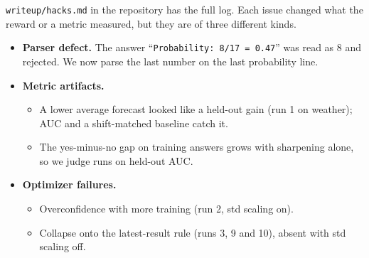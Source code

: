 \documentclass[11pt]{article}
\begin{document}
\texttt{writeup/hacks.md} in the repository has the full log. Each issue changed what the reward or a metric measured, but they are of three different kinds.
\begin{itemize}[leftmargin=*]\raggedright
\item \textbf{Parser defect.} The answer ``\texttt{Probability:~8/17~=~0.47}'' was read as 8 and rejected. We now parse the last number on the last probability line.
\item \textbf{Metric artifacts.}
  \begin{itemize}
  \item A lower average forecast looked like a held-out gain (run 1 on weather); AUC and a shift-matched baseline catch it.
  \item The yes-minus-no gap on training answers grows with sharpening alone, so we judge runs on held-out AUC.
  \end{itemize}
\item \textbf{Optimizer failures.}
  \begin{itemize}
  \item Overconfidence with more training (run 2, std scaling on).
  \item Collapse onto the latest-result rule (runs 3, 9 and 10), absent with std scaling off.
  \end{itemize}
\end{itemize}
\end{document}
